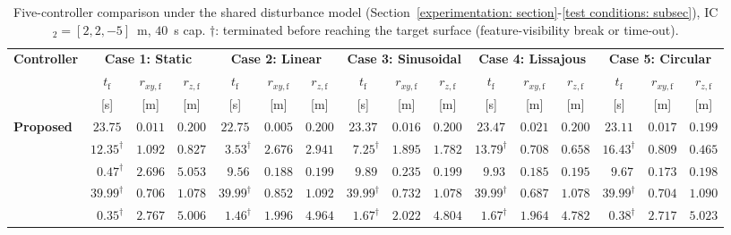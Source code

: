\begin{table}[!t]
\centering
\caption{Five-controller comparison under the shared disturbance model (Section~\ref{experimentation: section}-\ref{test conditions: subsec}), IC$_2=[2,2,-5]$~m, $40$~s cap. $\dagger$: terminated before reaching the target surface (feature-visibility break or time-out).}
\label{comparison: table}
\footnotesize
\setlength{\tabcolsep}{3.5pt}
\begin{tabular}{lccc@{\hskip 6pt}ccc@{\hskip 6pt}ccc@{\hskip 6pt}ccc@{\hskip 6pt}ccc}
\toprule
\multirow{3}{*}{\textbf{Controller}}
    & \multicolumn{3}{c}{\textbf{Case 1: Static}}
    & \multicolumn{3}{c}{\textbf{Case 2: Linear}}
    & \multicolumn{3}{c}{\textbf{Case 3: Sinusoidal}}
    & \multicolumn{3}{c}{\textbf{Case 4: Lissajous}}
    & \multicolumn{3}{c}{\textbf{Case 5: Circular}} \\
\cmidrule(lr){2-4}\cmidrule(lr){5-7}\cmidrule(lr){8-10}\cmidrule(lr){11-13}\cmidrule(lr){14-16}
    & $t_\text{f}$ & $r_{xy,\text{f}}$ & $r_{z,\text{f}}$
    & $t_\text{f}$ & $r_{xy,\text{f}}$ & $r_{z,\text{f}}$
    & $t_\text{f}$ & $r_{xy,\text{f}}$ & $r_{z,\text{f}}$
    & $t_\text{f}$ & $r_{xy,\text{f}}$ & $r_{z,\text{f}}$
    & $t_\text{f}$ & $r_{xy,\text{f}}$ & $r_{z,\text{f}}$ \\
    & [s] & [m] & [m]
    & [s] & [m] & [m]
    & [s] & [m] & [m]
    & [s] & [m] & [m]
    & [s] & [m] & [m] \\
\midrule
\textbf{Proposed}
    & $\mathbf{23.75}$           & $\mathbf{0.011}$ & $0.200$
    & $\mathbf{22.75}$           & $\mathbf{0.005}$ & $0.200$
    & $\mathbf{23.37}$           & $\mathbf{0.016}$ & $0.200$
    & $\mathbf{23.47}$           & $\mathbf{0.021}$ & $0.200$
    & $\mathbf{23.11}$           & $\mathbf{0.017}$ & $0.199$ \\
\cite{lin2022}
    & $12.35^\dagger$            & $1.092$ & $0.827$
    & $\phantom{0}3.53^\dagger$  & $2.676$ & $2.941$
    & $\phantom{0}7.25^\dagger$  & $1.895$ & $1.782$
    & $13.79^\dagger$            & $0.708$ & $0.658$
    & $16.43^\dagger$            & $0.809$ & $0.465$ \\
\cite{zhang2026}
    & $\phantom{0}0.47^\dagger$  & $2.696$ & $5.053$
    & $\phantom{0}9.56$          & $0.188$ & $0.199$
    & $\phantom{0}9.89$          & $0.235$ & $0.199$
    & $\phantom{0}9.93$          & $0.185$ & $0.195$
    & $\phantom{0}9.67$          & $0.173$ & $0.198$ \\
\cite{chen2025}
    & $39.99^\dagger$            & $0.706$ & $1.078$
    & $39.99^\dagger$            & $0.852$ & $1.092$
    & $39.99^\dagger$            & $0.732$ & $1.078$
    & $39.99^\dagger$            & $0.687$ & $1.078$
    & $39.99^\dagger$            & $0.704$ & $1.090$ \\
\cite{cho2022}
    & $\phantom{0}0.35^\dagger$  & $2.767$ & $5.006$
    & $\phantom{0}1.46^\dagger$  & $1.996$ & $4.964$
    & $\phantom{0}1.67^\dagger$  & $2.022$ & $4.804$
    & $\phantom{0}1.67^\dagger$  & $1.964$ & $4.782$
    & $\phantom{0}0.38^\dagger$  & $2.717$ & $5.023$ \\
\bottomrule
\end{tabular}
\end{table}

